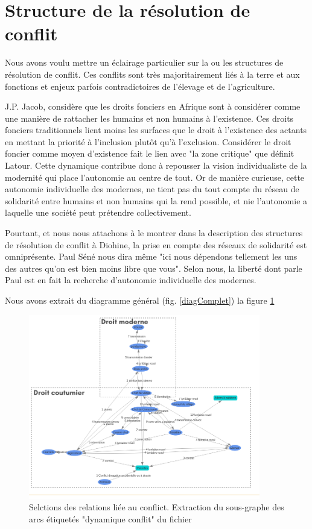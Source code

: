 \section{Structure de la résolution de conflit}

Nous avons voulu mettre un éclairage particulier sur la ou les structures de résolution de conflit. Ces conflits sont très majoritairement liés à la terre et aux fonctions et enjeux parfois contradictoires de l'élevage et de l'agriculture.

J.P. Jacob\cite{jacob_terres_2007}, considère que les droits fonciers en Afrique sont à considérer comme une manière de rattacher les humains et non humains à l'existence. Ces droits fonciers traditionnels lient moins les surfaces que le droit à l'existence des actants en mettant la priorité à l'inclusion plutôt qu'à l'exclusion. Considérer le droit foncier comme moyen d'existence fait le lien avec "la zone critique" que définit Latour\cite{latour_face_2015}. Cette dynamique contribue donc à repousser la vision individualiste de la modernité qui place l'autonomie au centre de tout. Or de manière curieuse, cette autonomie individuelle des modernes, ne tient pas du tout compte du réseau de solidarité entre humains et non humains qui la rend possible, et nie l'autonomie a laquelle une société peut prétendre collectivement.

Pourtant, et nous nous  attachons à le montrer dans la description des structures de résolution de conflit à Diohine, la prise en compte des réseaux de solidarité est omniprésente. Paul Séné nous dira même "ici nous dépendons tellement les uns des autres qu'on est bien moins libre que vous". Selon nous, la liberté dont parle Paul est en fait la recherche d'autonomie individuelle des modernes.


Nous avons extrait du diagramme général (fig. \ref{diagComplet}) la figure \ref{fig:conflict}

\begin{figure}
  \begin{center}
    \includegraphics[width=0.9\textwidth]{img/zoneDroitConflits.png}
  \end{center}
  \caption{Selctions des relations liée au conflict. Extraction du sous-graphe des arcs étiquetés "dynamique conflit" du fichier}
  \label{fig:conflict}
\end{figure}


